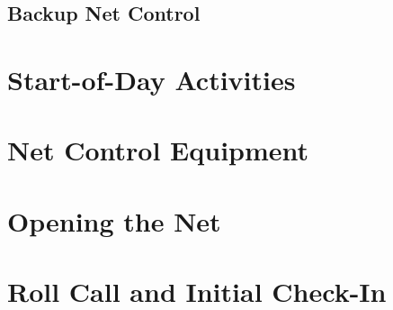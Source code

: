 \documentclass[pdflatex,letterpaper,twoside,12pt]{book}
\begin{document}
\iffalse %
Describe role, types of traffic, etc
\fi

\subsection{Backup Net Control}

\iffalse %
Describe role, types of traffic, etc
\fi


\section{Start-of-Day Activities}

\iffalse %
Equipment checks, opening script, etc
...and is this the best placement for this section?
\fi


\section{Net Control Equipment}

\iffalse %
going forward things will be 
color coded.... For example. the Medical Repeater will have a red electrical 
tape ring on the antenna, coax, the radios, etc... (or something similar. they 
will also be labeled with Frequency and use ie: Medical 461.800
\fi %


\section{Opening the Net}


\section{Roll Call and Initial Check-In}
\end{document}
